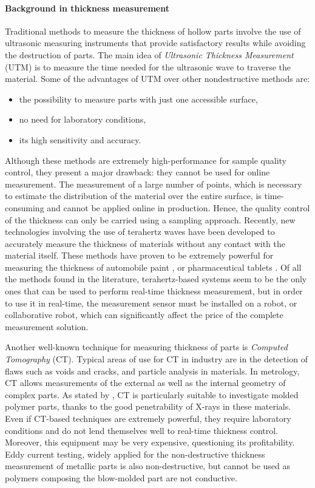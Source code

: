 \paragraph{Background in thickness measurement}

Traditional methods to measure the thickness of hollow parts involve the use of ultrasonic measuring instruments that provide satisfactory results while avoiding the destruction of parts. The main idea of \textit{Ultrasonic Thickness Measurement} (UTM) is to measure the time needed for the ultrasonic wave to traverse the material. Some of the advantages of UTM over other nondestructive methods are:
\begin{itemize}
    \item the possibility to measure parts with just one accessible surface,
    \item no need for laboratory conditions,
    \item its high sensitivity and accuracy.
\end{itemize}
 
Although these methods are extremely high-performance for sample quality control, they present a major drawback: they cannot be used for online measurement. The measurement of a large number of points, which is necessary to estimate the distribution of the material over the entire surface, is time-consuming and cannot be applied online in production. Hence, the quality control of the thickness can only be carried using a sampling approach. Recently, new technologies involving the use of terahertz waves have been developed to accurately measure the thickness of materials without any contact with the material itself. These methods have proven to be extremely powerful for measuring the thickness of automobile paint \citep{su2014terahertz,krimi2016highly}, or pharmaceutical tablets \citep{may2011terahertz}. Of all the methods found in the literature, terahertz-based systems seem to be the only ones that can be used to perform real-time thickness measurement, but in order to use it in real-time, the measurement sensor must be installed on a robot, or collaborative robot, which can significantly affect the price of the complete measurement solution.

Another well-known technique for measuring thickness of parts is \textit{Computed Tomography} (CT). Typical areas of use for CT in industry are in the detection of flaws such as voids and cracks, and particle analysis in materials. In metrology, CT allows measurements of the external as well as the internal geometry of complex parts. As stated by \citet{de2014industrial}, CT is particularly suitable to investigate molded polymer parts, thanks to the good penetrability of X-rays in these materials. Even if CT-based techniques are extremely powerful, they require laboratory conditions and  do not lend themselves well to real-time thickness control. Moreover, this equipment may be very expensive, questioning its profitability.
%
Eddy current testing, widely applied for the non-destructive thickness measurement of metallic parts \citep{cheng2017thickness,mao2016thickness,wang2015noncontact,yin2007thickness}  is also non-destructive, but cannot be used as polymers composing the blow-molded part are not conductive.

